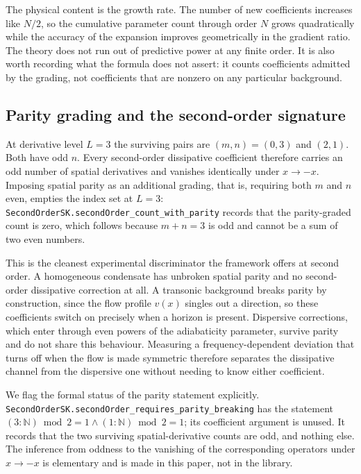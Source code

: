 \documentclass[aps,prd,reprint,nofootinbib,superscriptaddress]{revtex4-2}
\begin{document}
The physical content is the growth rate. The number of new coefficients
increases like $N/2$, so the cumulative parameter count through order
$N$ grows quadratically while the accuracy of the expansion improves
geometrically in the gradient ratio. The theory does not run out of
predictive power at any finite order. It is also worth recording what
the formula does not assert: it counts coefficients admitted by the
grading, not coefficients that are nonzero on any particular background.

\subsection{Parity grading and the second-order signature}
\label{sec:higher-parity}

At derivative level $L = 3$ the surviving pairs are $(m,n) = (0,3)$ and
$(2,1)$. Both have odd $n$. Every second-order dissipative coefficient
therefore carries an odd number of spatial derivatives and vanishes
identically under $x \to -x$. Imposing spatial parity as an additional
grading, that is, requiring both $m$ and $n$ even, empties the index set
at $L=3$: \texttt{SecondOrderSK.secondOrder\_count\_with\_parity}
records that the parity-graded count is zero, which follows because
$m+n=3$ is odd and cannot be a sum of two even numbers.

This is the cleanest experimental discriminator the framework offers at
second order. A homogeneous condensate has unbroken spatial parity and
no second-order dissipative correction at all. A transonic background
breaks parity by construction, since the flow profile $v(x)$ singles out
a direction, so these coefficients switch on precisely when a horizon is
present. Dispersive corrections, which enter through even powers of the
adiabaticity parameter, survive parity and do not share this behaviour.
Measuring a frequency-dependent deviation that turns off when the flow
is made symmetric therefore separates the dissipative channel from the
dispersive one without needing to know either coefficient.

We flag the formal status of the parity statement explicitly.
\texttt{SecondOrderSK.secondOrder\_requires\_parity\_breaking} has the
statement $(3 : \mathbb{N}) \bmod 2 = 1 \wedge (1 : \mathbb{N}) \bmod 2
= 1$; its coefficient argument is unused. It records that the two
surviving spatial-derivative counts are odd, and nothing else. The
inference from oddness to the vanishing of the corresponding operators
under $x \to -x$ is elementary and is made in this paper, not in the
library.
\end{document}
